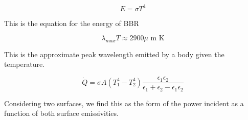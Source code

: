 \begin{equation}
	E = \sigma T^4
\end{equation}

This is the equation for the energy of BBR

\begin{equation}
	\lambda_{max}T \approx 2900\mu \text{ m K}
\end{equation}

This is the approximate peak wavelength emitted by a body given the temperature.

\begin{equation}
	\dot{Q} = \sigma A (T_1^4 - T_2^4)\frac{\epsilon_1 \epsilon_2}{\epsilon_1 + \epsilon_2 - \epsilon_1 \epsilon_2}
\end{equation}

Considering two surfaces, we find this as the form of the power incident as a function of both surface emissivities.

